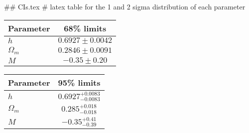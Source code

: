 ## CIs.tex
# latex table for the 1 and 2 sigma distribution of each parameter

\begin{tabular} { l  c}
 Parameter &  68\% limits\\
\hline
{\boldmath$h              $} & $0.6927\pm 0.0042          $\\
{\boldmath$\Omega_m       $} & $0.2846\pm 0.0091          $\\
{\boldmath$M              $} & $-0.35\pm 0.20             $\\
\hline
\end{tabular}

\begin{tabular} { l  c}
 Parameter &  95\% limits\\
\hline
{\boldmath$h              $} & $0.6927^{+0.0083}_{-0.0083}$\\
{\boldmath$\Omega_m       $} & $0.285^{+0.018}_{-0.018}   $\\
{\boldmath$M              $} & $-0.35^{+0.41}_{-0.39}     $\\
\hline
\end{tabular}
